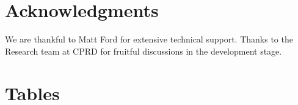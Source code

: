 \documentclass[10pt]{article}
\begin{document}
\section*{Acknowledgments}
We are thankful to Matt Ford for extensive technical support. Thanks to the Research team at CPRD for fruitful discussions in the development stage.







\section*{Tables}
\end{document}
